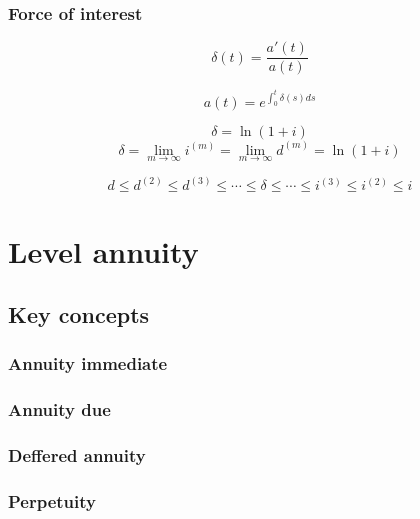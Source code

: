\documentclass[
]{book}
\begin{document}
\hypertarget{force-of-interest}{%
\subsection*{Force of interest}\label{force-of-interest}}

\[\delta(t)=\frac{a'(t)}{a(t)}\]

\[a(t)=e^{\int_0^t\delta(s)ds}\]

\[\delta=\ln(1+i)\]
\[\delta=\lim_{m\rightarrow\infty} i^{(m)}=\lim_{m\rightarrow\infty} d^{(m)}=\ln(1+i)\]

\[d\le d^{(2)}\le d^{(3)}\le\cdots\le \delta\le\cdots\le i^{(3)}\le i^{(2)}\le i\]

\hypertarget{level-annuity}{%
\chapter{Level annuity}\label{level-annuity}}

\hypertarget{key-concepts}{%
\section{Key concepts}\label{key-concepts}}

\hypertarget{annuity-immediate}{%
\subsection*{Annuity immediate}\label{annuity-immediate}}

\hypertarget{annuity-due}{%
\subsection*{Annuity due}\label{annuity-due}}

\hypertarget{deffered-annuity}{%
\subsection*{Deffered annuity}\label{deffered-annuity}}

\hypertarget{perpetuity}{%
\subsection*{Perpetuity}\label{perpetuity}}
\end{document}
